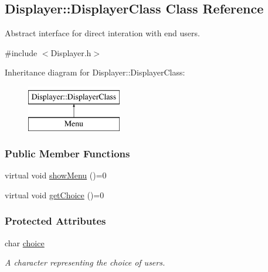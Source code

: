 \hypertarget{class_displayer_1_1_displayer_class}{\subsection{Displayer\+:\+:Displayer\+Class Class Reference}
\label{class_displayer_1_1_displayer_class}
}


Abstract interface for direct interation with end users.  




{\ttfamily \#include $<$Displayer.\+h$>$}

Inheritance diagram for Displayer\+:\+:Displayer\+Class\+:\begin{figure}[H]
\begin{center}
\leavevmode
\includegraphics[height=2.000000cm]{class_displayer_1_1_displayer_class}
\end{center}
\end{figure}
\subsubsection*{Public Member Functions}
\begin{DoxyCompactItemize}
\item 
virtual void \hyperlink{class_displayer_1_1_displayer_class_aa259ca88fafe20ad118cb8a492c88351}{show\+Menu} ()=0
\item 
virtual void \hyperlink{class_displayer_1_1_displayer_class_ac61f3852eda7fe91a189927d33d4aef5}{get\+Choice} ()=0
\end{DoxyCompactItemize}
\subsubsection*{Protected Attributes}
\begin{DoxyCompactItemize}
\item 
\hypertarget{class_displayer_1_1_displayer_class_a13a8fff0d761fc68d208d5bb16429395}{char \hyperlink{class_displayer_1_1_displayer_class_a13a8fff0d761fc68d208d5bb16429395}{choice}}\label{class_displayer_1_1_displayer_class_a13a8fff0d761fc68d208d5bb16429395}

\begin{DoxyCompactList}\small\item\em A character representing the choice of users. \end{DoxyCompactList}\end{DoxyCompactItemize}
